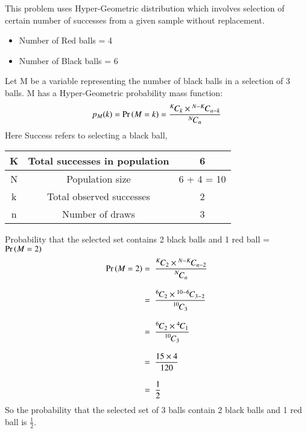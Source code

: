 
This problem uses Hyper-Geometric distribution which involves selection of certain number of \newline successes from a given sample without replacement.
\begin{itemize}
    \item Number of Red balls = 4
    \item Number of Black balls = 6
\end{itemize}
Let M be a variable representing the number of black balls in a selection of 3 balls.
M has a \newline Hyper-Geometric probability mass function:
\begin{equation}
    p_M(k) = \Pr\left(M = k\right) = \frac{{{}^{K}\mkern-1muC_{k}} \times {{}^{N-K}\mkern-1muC_{n-k}}}{{{}^{N}\mkern-1muC_{n}}}
\end{equation}
Here Success refers to selecting a black ball,
\begin{table}[!ht]
    \begin{center}
        \resizebox{\columnwidth}{!}
        {
            \begin{tabular}{|c|c|c|}
                \hline
                K & Total successes in population & 6\\
                \hline
                N & Population size & 6 + 4 = 10\\
                \hline
                k & Total observed successes & 2\\
                \hline
                n & Number of draws & 3\\
                \hline
            \end{tabular}
        }
    \end{center}
\end{table}
Probability that the selected set contains 2 black balls and 1 red ball = $\Pr\left(M = 2\right)$
\begin{align}
    \Pr\left(M = 2\right) = \hspace{0.2cm}& \frac{{{}^{K}\mkern-1muC_{2}} \times {{}^{N-K}\mkern-1muC_{n-2}}}{\displaystyle{{{}^{N}\mkern-1muC_{n}}}}\\[0.3cm]
               = \hspace{0.2cm}& \frac{{{}^{6}\mkern-1muC_{2}} \times {{}^{10-6}\mkern-1muC_{3-2}}}{\displaystyle{{{}^{10}\mkern-1muC_{3}}}}\\[0.3cm]
               = \hspace{0.2cm}& \frac{{{}^{6}\mkern-1muC_{2}} \times {{}^{4}\mkern-1muC_{1}}}{\displaystyle{{{}^{10}\mkern-1muC_{3}}}}\\[0.3cm]
               = \hspace{0.2cm}& \frac{15 \times 4}{120}\\[0.3cm]
               = \hspace{0.2cm}& \frac{1}{2}
\end{align}
So the probability that the selected set of 3 balls contain 2 black balls and 1 red ball is $\displaystyle{\frac{1}{2}}$.